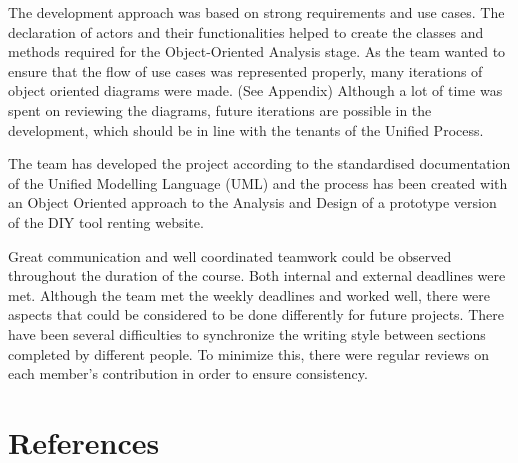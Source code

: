 \documentclass[fontsize=11pt]{extarticle}
\numberwithin{figure}{section} %
\numberwithin{table}{section}%
\begin{document}
The development approach was based on strong requirements and use cases.
The declaration of actors and their functionalities helped to create the
classes and methods required for the Object-Oriented Analysis stage. As
the team wanted to ensure that the flow of use cases was represented
properly, many iterations of object oriented diagrams were made. (See
Appendix) Although a lot of time was spent on reviewing the diagrams,
future iterations are possible in the development, which should be in
line with the tenants of the Unified Process.

The team has developed the project according to the standardised
documentation of the Unified Modelling Language (UML) and the process
has been created with an Object Oriented approach to the Analysis and
Design of a prototype version of the DIY tool renting website.

Great communication and well coordinated teamwork could be observed
throughout the duration of the course. Both internal and external
deadlines were met. Although the team met the weekly deadlines and
worked well, there were aspects that could be considered to be done
differently for future projects. There have been several difficulties to
synchronize the writing style between sections completed by different
people. To minimize this, there were regular reviews on each member's
contribution in order to ensure consistency.

\newpage

\hypertarget{references}{%
\section{References}\label{references}}
\end{document}

